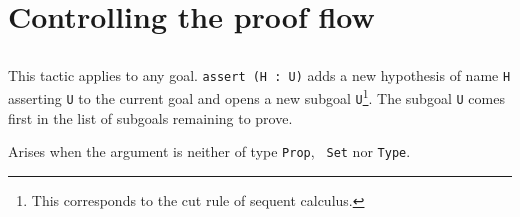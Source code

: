 \section{Controlling the proof flow}

\subsection{}

This tactic applies to any goal. {\tt assert (H : U)} adds a new
hypothesis of name \texttt{H} asserting \texttt{U} to the current goal
and opens a new subgoal \texttt{U}\footnote{This corresponds to the
  cut rule of sequent calculus.}. The subgoal {\texttt U} comes first
in the list of subgoals remaining to prove.

\begin{ErrMsgs}
\item {}

  Arises when the argument {\form} is neither of type {\tt Prop}, {\tt
    Set} nor {\tt Type}.

\end{ErrMsgs}

